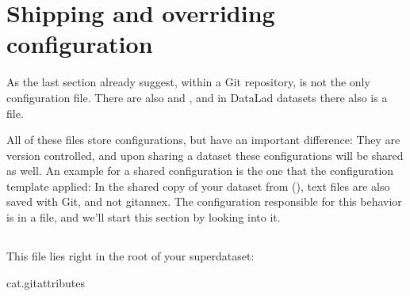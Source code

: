 \sphinxstepscope


\section{Shipping and overriding configuration}
\label{\detokenize{basics/101-123-config2:shipping-and-overriding-configuration}}\label{\detokenize{basics/101-123-config2:config2}}\label{\detokenize{basics/101-123-config2::doc}}
\sphinxAtStartPar
As the last section already suggest, within a Git repository,
 is not the only configuration file.
There are also  and , and in DataLad datasets
there also is a  file.

\sphinxAtStartPar
All of these files store configurations, but have an important difference:
They are version controlled, and upon sharing a dataset these configurations
will be shared as well. An example for a shared configuration
is the one that the  configuration template applied:
In the shared copy of your dataset from {\hyperref[\detokenize{basics/101-121-siblings:sibling}]{}} (), text files are also saved with Git,
and not git\sphinxhyphen{}annex. The configuration responsible
for this behavior is in a  file, and we’ll start this
section by looking into it.

\ignorespaces 

\subsection{}
\label{\detokenize{basics/101-123-config2:gitattributes}}\label{\detokenize{basics/101-123-config2:index-0}}
\sphinxAtStartPar
This file lies right in the root of your superdataset:

\begin{sphinxVerbatim}[commandchars=\\\{\}]
cat.gitattributes
\end{sphinxVerbatim}

